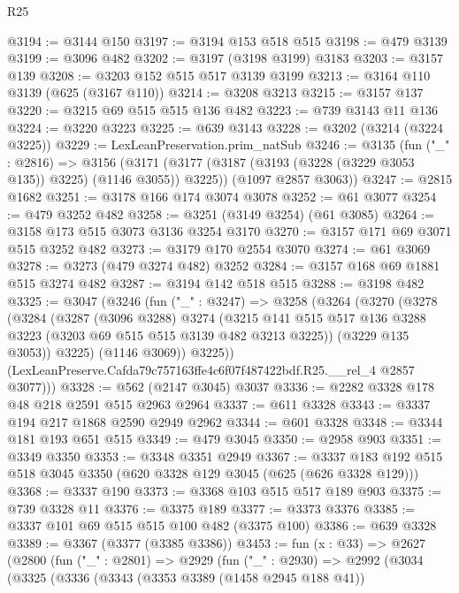 \begin{lexlean}{R25}
\begin{coremodule}
@3194 := @3144 @150
@3197 := @3194 @153 @518 @515
@3198 := @479 @3139
@3199 := @3096 @482
@3202 := @3197 (@3198 @3199) @3183
@3203 := @3157 @139
@3208 := @3203 @152 @515 @517 @3139 @3199
@3213 := @3164 @110 @3139 (@625 (@3167 @110))
@3214 := @3208 @3213
@3215 := @3157 @137
@3220 := @3215 @69 @515 @515 @136 @482
@3223 := @739 @3143 @11 @136
@3224 := @3220 @3223
@3225 := @639 @3143
@3228 := @3202 (@3214 (@3224 @3225))
@3229 := LexLeanPreservation.prim_natSub
@3246 := @3135
    (fun ("_" : @2816) =>
    @3156
      (@3171 (@3177 (@3187 (@3193 (@3228 (@3229 @3053 @135)) @3225) (@1146 @3055)) @3225))
      (@1097 @2857 @3063))
@3247 := @2815 @1682
@3251 := @3178 @166 @174 @3074 @3078
@3252 := @61 @3077
@3254 := @479 @3252 @482
@3258 := @3251 (@3149 @3254) (@61 @3085)
@3264 := @3158 @173 @515 @3073 @3136 @3254 @3170
@3270 := @3157 @171 @69 @3071 @515 @3252 @482
@3273 := @3179 @170 @2554 @3070
@3274 := @61 @3069
@3278 := @3273 (@479 @3274 @482) @3252
@3284 := @3157 @168 @69 @1881 @515 @3274 @482
@3287 := @3194 @142 @518 @515
@3288 := @3198 @482
@3325 := @3047
    (@3246
      (fun ("_" : @3247) =>
      @3258
        (@3264
          (@3270
            (@3278
              (@3284
                (@3287
                  (@3096 @3288)
                  @3274
                  (@3215
                    @141
                    @515
                    @517
                    @136
                    @3288
                    @3223
                    (@3203 @69 @515 @515 @3139 @482 @3213 @3225))
                  (@3229 @135 @3053))
                @3225)
              (@1146 @3069))
            @3225))
        (LexLeanPreserve.Cafda79c757163ffe4c6f07f487422bdf.R25.__rel_4 @2857 @3077)))
@3328 := @562 (@2147 @3045) @3037
@3336 := @2282 @3328 @178 @48 @218 @2591 @515 @2963 @2964
@3337 := @611 @3328
@3343 := @3337 @194 @217 @1868 @2590 @2949 @2962
@3344 := @601 @3328
@3348 := @3344 @181 @193 @651 @515
@3349 := @479 @3045
@3350 := @2958 @903
@3351 := @3349 @3350
@3353 := @3348 @3351 @2949
@3367 := @3337 @183 @192 @515 @518 @3045 @3350 (@620 @3328 @129 @3045 (@625 (@626 @3328 @129)))
@3368 := @3337 @190
@3373 := @3368 @103 @515 @517 @189 @903
@3375 := @739 @3328 @11
@3376 := @3375 @189
@3377 := @3373 @3376
@3385 := @3337 @101 @69 @515 @515 @100 @482 (@3375 @100)
@3386 := @639 @3328
@3389 := @3367 (@3377 (@3385 @3386))
@3453 := fun (x : @33) =>
  @2627
    (@2800
      (fun ("_" : @2801) =>
      @2929
        (fun ("_" : @2930) =>
        @2992
          (@3034
            (@3325
              (@3336
                (@3343
                  (@3353 @3389 (@1458 @2945 @188 @41))

\end{coremodule}
\end{lexlean}

